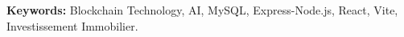 \vspace{0.3cm}
\begin{tcolorbox}[
    colback=background,
    colframe=primary,
    arc=1mm,
    boxrule=0.5pt,
    left=8pt,
    right=8pt,
    top=4pt,
    bottom=4pt,
    width=\textwidth
]
\textbf{Keywords:} Blockchain Technology, AI, MySQL, Express-Node.js, React, Vite, Investissement Immobilier.
\end{tcolorbox}

\nopagebreak 